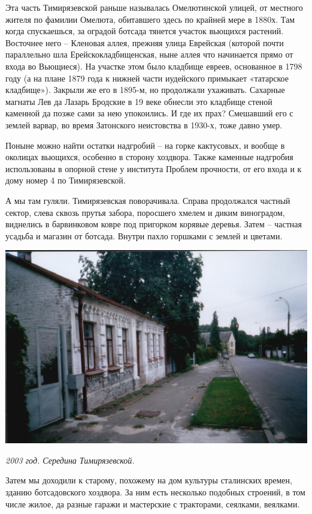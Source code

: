 Эта часть Тимирязевской раньше называлась Омелютинской улицей, от местного жителя по фамилии Омелюта, обитавшего здесь по крайней мере в 1880х. Там когда спускаешься, за оградой ботсада тянется участок вьющихся растений. Восточнее него – Кленовая аллея, прежняя улица Еврейская (которой почти параллельно шла Ерейскокладбищенская, ныне аллея что начинается прямо от входа во Вьющиеся). На участке этом было кладбище евреев, основанное в 1798 году (а на плане 1879 года к нижней части иудейского примыкает «татарское кладбище»). Закрыли же его в 1895-м, но продолжали ухаживать. Сахарные магнаты Лев да Лазарь Бродские в 19 веке обнесли это кладбище стеной каменной да позже сами за нею упокоились. И где их прах? Смешавший его с землей варвар, во время Затонского неистовства в 1930-х, тоже давно умер.

Поныне можно найти остатки надгробий – на горке кактусовых, и вообще в околицах вьющихся, особенно в сторону хоздвора. 
Также каменные надгробия использованы в опорной стене у института Проблем прочности, от его входа и к дому номер 4 по Тимирязевской.

А мы там гуляли. Тимирязевская поворачивала. Справа продолжался частный сектор, слева сквозь прутья забора, поросшего хмелем и диким виноградом, виднелись в барвинковом ковре под пригорком корявые деревья. Затем – частная усадьба и магазин от ботсада. Внутри пахло горшками с землей и цветами.

\begin{center}
\includegraphics[width=\linewidth]{chast-vosp/zver/out0014.jpg}

\textit{2003 год. Середина Тимирязевской.}
\end{center}

Затем мы доходили к старому, похожему на дом культуры сталинских времен, зданию ботсадовского хоздвора. За ним есть несколько подобных строений, в том числе жилое, да разные гаражи и мастерские с тракторами, сеялками, веялками.


